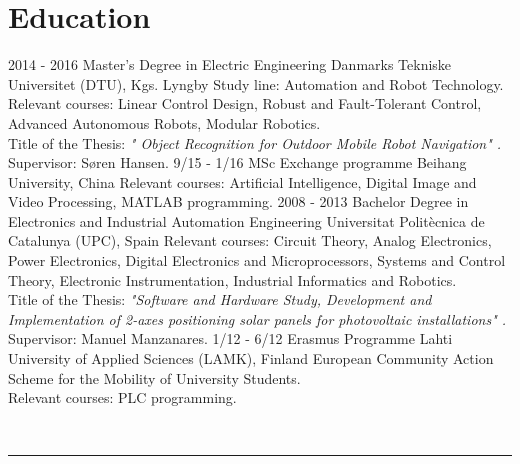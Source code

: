 \documentclass[]{friggeri-cv}
\begin{document}
\section{Education}
\begin{entrylist}
  \entry
    {2014 - 2016}
    {Master's Degree in Electric Engineering}
    {Danmarks Tekniske Universitet (DTU), Kgs. Lyngby}
    {Study line: Automation and Robot Technology.\\Relevant courses: Linear Control Design, Robust and Fault-Tolerant Control, Advanced Autonomous Robots, Modular Robotics.\\ %
    Title of the Thesis: \emph{"	Object Recognition for Outdoor Mobile Robot Navigation"      .} Supervisor: Søren Hansen.\vspace*{0.05cm}}
  \entry
    {9/15 - 1/16}
    {MSc Exchange programme}
    {Beihang University, China}
    {
    Relevant courses: Artificial Intelligence, Digital Image and Video Processing, MATLAB programming.\vspace*{0.05cm}}
  \entry
    {2008 - 2013}
    {Bachelor Degree in Electronics and Industrial Automation Engineering}
    {Universitat Politècnica de Catalunya (UPC), Spain}
    {Relevant courses: Circuit Theory, Analog Electronics, Power Electronics, Digital Electronics and Microprocessors, Systems and Control Theory, Electronic Instrumentation, Industrial Informatics and Robotics.\\
    Title of the Thesis: \emph{"Software and Hardware Study, Development and Implementation of 2-axes positioning solar panels for photovoltaic installations"      .} Supervisor: Manuel Manzanares.\vspace*{0.05cm}}
  \entry
    {1/12 - 6/12}
    {Erasmus Programme}
    {Lahti University of Applied Sciences (LAMK), Finland}
    {European Community Action Scheme for the Mobility of University Students.\\
    Relevant courses: PLC programming.}
    

\end{entrylist}
\vspace{1cm}\\
\textcolor{gray}{\rule{\textwidth}{1.5pt}}\vspace*{0.2cm}
\end{document}

